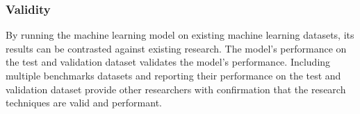 \subsubsection{Validity}

By running the machine learning model on existing machine learning datasets, its results can be contrasted against existing research.  The model's performance on the test and validation dataset validates the model's performance.  Including multiple benchmarks datasets and reporting their performance on the test and validation dataset provide other researchers with confirmation that the research techniques are valid and performant.  
